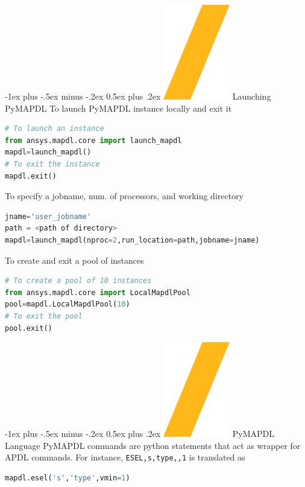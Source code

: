 \documentclass[9pt,landscape]{article}
\makeatletter
\renewcommand{\section}{\@startsection{section}{1}{0mm}%
                                {-1ex plus -.5ex minus -.2ex}%
                                {0.5ex plus .2ex}%
                                {\normalfont\large\bfseries}}
\def\code#1{\texttt{#1}}
\makeatother
\begin{document}
\begin{multicols}{3}
\setlength{\premulticols}{1pt}
\setlength{\postmulticols}{1pt}
\setlength{\multicolsep}{1pt}
\setlength{\columnsep}{2pt}

\section{\includegraphics[height=\fontcharht\font`\S]{slash.png} Launching PyMAPDL}
To launch PyMAPDL instance locally and exit it
\begin{lstlisting}[language=Python]
# To launch an instance
from ansys.mapdl.core import launch_mapdl
mapdl=launch_mapdl()
# To exit the instance
mapdl.exit()
\end{lstlisting}

To specify a jobname, num. of processors, and working directory
\begin{lstlisting}[language=Python]
jname='user_jobname'
path = <path of directory>
mapdl=launch_mapdl(nproc=2,run_location=path,jobname=jname)
\end{lstlisting}

To create and exit a pool of instances
\begin{lstlisting}[language=Python]
# To create a pool of 10 instances
from ansys.mapdl.core import LocalMapdlPool
pool=mapdl.LocalMapdlPool(10)
# To exit the pool
pool.exit()
\end{lstlisting}

\section{\includegraphics[height=\fontcharht\font`\S]{slash.png} PyMAPDL Language}
PyMAPDL commands are python statements that act as wrapper for APDL commands. For instance, \code{ESEL,s,type,,1} is translated as
\begin{lstlisting}[language=Python]
mapdl.esel('s','type',vmin=1) 
\end{lstlisting}


\end{multicols}
\end{document}
